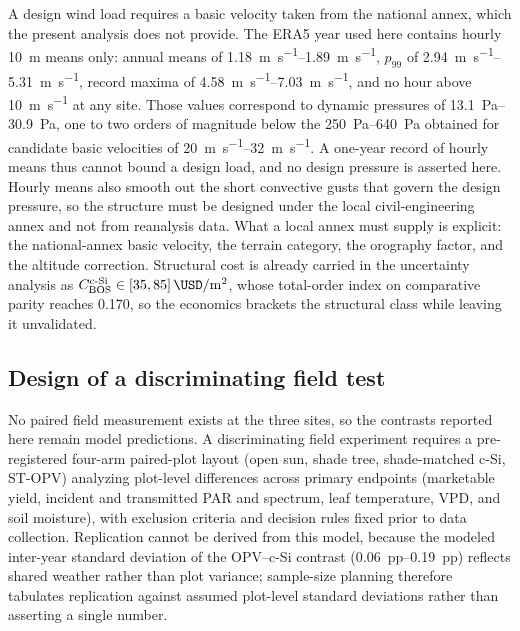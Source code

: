 \documentclass[preprint,12pt,a4paper]{elsarticle}
\begin{document}
A design wind load requires a basic velocity taken from the national annex, which the present analysis does not provide. The ERA5 year used here contains hourly \qty{10}{\meter} means only: annual means of \qtyrange{1.18}{1.89}{\meter\per\second}, $p_{99}$ of \qtyrange{2.94}{5.31}{\meter\per\second}, record maxima of \qtyrange{4.58}{7.03}{\meter\per\second}, and no hour above \qty{10}{\meter\per\second} at any site. Those values correspond to dynamic pressures of \qtyrange{13.1}{30.9}{\pascal}, one to two orders of magnitude below the \qtyrange{250}{640}{\pascal} obtained for candidate basic velocities of \qtyrange{20}{32}{\meter\per\second}. A one-year record of hourly means thus cannot bound a design load, and no design pressure is asserted here. Hourly means also smooth out the short convective gusts that govern the design pressure, so the structure must be designed under the local civil-engineering annex and not from reanalysis data. What a local annex must supply is explicit: the national-annex basic velocity, the terrain category, the orography factor, and the altitude correction. Structural cost is already carried in the uncertainty analysis as $C_{\mathrm{BOS}}^{\mathrm{c\text{-}Si}}\in[\num{35},\num{85}]\,\unit{\USD\per\square\meter}$, whose total-order index on comparative parity reaches \num{0.170}, so the economics brackets the structural class while leaving it unvalidated.

\subsection{Design of a discriminating field test}
\label{sec:sm_field_design}

No paired field measurement exists at the three sites, so the contrasts reported here remain model predictions. A discriminating field experiment requires a pre-registered four-arm paired-plot layout (open sun, shade tree, shade-matched c-Si, ST-OPV) analyzing plot-level differences across primary endpoints (marketable yield, incident and transmitted PAR and spectrum, leaf temperature, VPD, and soil moisture), with exclusion criteria and decision rules fixed prior to data collection. Replication cannot be derived from this model, because the modeled inter-year standard deviation of the OPV--c-Si contrast (\qtyrange{0.06}{0.19}{pp}) reflects shared weather rather than plot variance; sample-size planning therefore tabulates replication against assumed plot-level standard deviations rather than asserting a single number.
\end{document}
